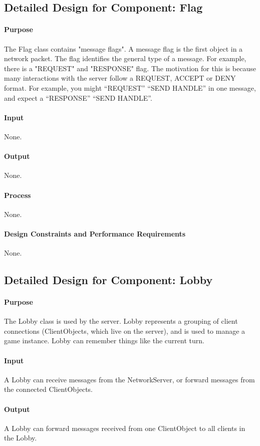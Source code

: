 \documentclass[12pt,a4paper,titlepage]{article}
\begin{document}
\subsection{Detailed Design for Component: Flag }
\paragraph{Purpose} The Flag class contains "message flags". A message flag is the first object in a network packet. The flag identifies the general type of a message. For example, there is a "REQUEST" and "RESPONSE" flag. The motivation for this is because many interactions with the server follow a REQUEST, ACCEPT or DENY format. For example, you might ``REQUEST'' ``SEND HANDLE'' in one message, and expect a ``RESPONSE'' ``SEND HANDLE''.
\paragraph{Input} None.
\paragraph{Output} None.
\paragraph{Process} None.
\paragraph{Design Constraints and Performance Requirements} None.
	
\subsection{Detailed Design for Component: Lobby }
\paragraph{Purpose} The Lobby class is used by the server. Lobby represents a grouping of client connections (ClientObjects, which live on the server), and is used to manage a game instance. Lobby can remember things like the current turn. 
\paragraph{Input} A Lobby can receive messages from the NetworkServer, or forward messages from the connected ClientObjects. 
\paragraph{Output} A Lobby can forward messages received from one ClientObject to all clients in the Lobby.
\end{document}
